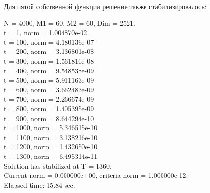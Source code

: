 \documentclass[12pt,a4paper]{article}
\begin{document}
Для пятой собственной функции решение также стабилизировалось:
\begin{center}
N = 4000, M1 =  60, M2 =  60, Dim =   2521.                     \\
t =   1, norm = 1.004870e-02                                    \\
t = 100, norm = 4.180139e-07                                    \\
t = 200, norm = 3.136801e-08                                    \\
t = 300, norm = 1.561810e-08                                    \\
t = 400, norm = 9.548538e-09                                    \\
t = 500, norm = 5.911163e-09                                    \\
t = 600, norm = 3.662483e-09                                    \\
t = 700, norm = 2.266674e-09                                    \\
t = 800, norm = 1.405395e-09                                    \\
t = 900, norm = 8.644294e-10                                    \\
t = 1000, norm = 5.346515e-10                                   \\
t = 1100, norm = 3.138216e-10                                   \\
t = 1200, norm = 1.432650e-10                                   \\
t = 1300, norm = 6.495314e-11                                   \\
Solution has stabilized at T = 1360.                            \\
Current norm = 0.000000e+00, criteria norm = 1.000000e-12.      \\
Elapsed time: 15.84 sec.
\end{center}
\end{document}
